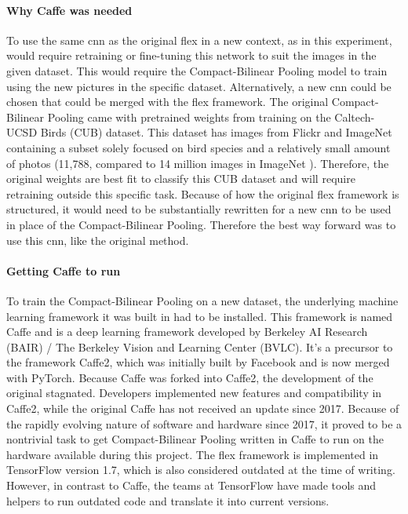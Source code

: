             \paragraph{Why Caffe was needed\\}
            To use the same \gls{cnn} as the original \gls{flex} in a new context, as in this experiment, would require retraining or fine-tuning this network to suit the images in the given dataset. This would require the Compact-Bilinear Pooling model to train using the new pictures in the specific dataset. Alternatively, a new \gls{cnn} could be chosen that could be merged with the \gls{flex} framework. The original Compact-Bilinear Pooling came with pretrained weights from training on the Caltech-UCSD Birds (CUB) \cite{PeronaLabCUB2002011} dataset. This dataset has images from Flickr and ImageNet containing a subset solely focused on bird species and a relatively small amount of photos (11,788, compared to 14 million images in ImageNet \cite{dengImageNetLargeScaleHierarchical2009}). Therefore, the original weights are best fit to classify this CUB dataset and will require retraining outside this specific task.
            Because of how the original \gls{flex} framework is structured, it would need to be substantially rewritten for a new \gls{cnn} to be used in place of the Compact-Bilinear Pooling. Therefore the best way forward was to use this \gls{cnn}, like the original method.

            \paragraph{Getting Caffe to run\\}
            To train the Compact-Bilinear Pooling on a new dataset, the underlying machine learning framework it was built in had to be installed.
            This framework is named Caffe and is a deep learning framework developed by Berkeley AI Research (BAIR) / The Berkeley Vision and Learning Center (BVLC). It's a precursor to the framework  Caffe2, which was initially built by Facebook and is now merged with PyTorch. Because Caffe was forked into Caffe2, the development of the original stagnated. Developers implemented new features and compatibility in Caffe2, while the original Caffe has not received an update since 2017. 
            Because of the rapidly evolving nature of software and hardware since 2017, it proved to be a nontrivial task to get Compact-Bilinear Pooling written in Caffe to run on the hardware available during this project.
            The \gls{flex} framework is implemented in TensorFlow version 1.7, which is also considered outdated at the time of writing. However, in contrast to Caffe, the teams at TensorFlow have made tools and helpers to run outdated code and translate it into current versions.


